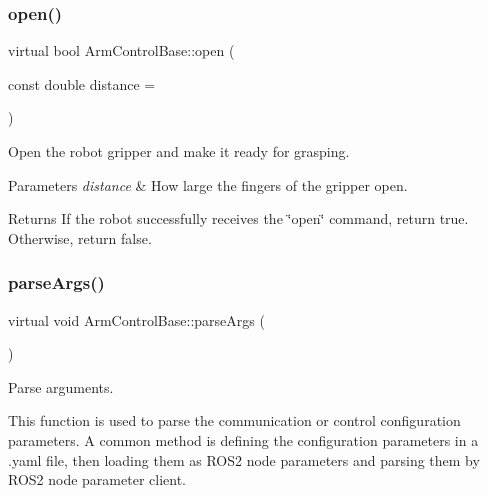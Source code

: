\subsubsection{\texorpdfstring{open()}{open()}}
{\footnotesize\ttfamily virtual bool Arm\+Control\+Base\+::open (\begin{DoxyParamCaption}\item[{const double}]{distance = {} }\end{DoxyParamCaption})\hspace{0.3cm}{\ttfamily [pure virtual]}}



Open the robot gripper and make it ready for grasping. 


\begin{DoxyParams}{Parameters}
{\em distance} & How large the fingers of the gripper open. \\
\hline
\end{DoxyParams}
\begin{DoxyReturn}{Returns}
If the robot successfully receives the \char`\"{}open\char`\"{} command, return true. Otherwise, return false. 
\end{DoxyReturn}
\mbox{\label{classArmControlBase_ad7127c4d537e4cf386e0b315c4ae7386}} 
\subsubsection{\texorpdfstring{parse\+Args()}{parseArgs()}}
{\footnotesize\ttfamily virtual void Arm\+Control\+Base\+::parse\+Args (\begin{DoxyParamCaption}{ }\end{DoxyParamCaption})\hspace{0.3cm}{\ttfamily [pure virtual]}}



Parse arguments. 

This function is used to parse the communication or control configuration parameters. A common method is defining the configuration parameters in a .yaml file, then loading them as R\+O\+S2 node parameters and parsing them by R\+O\+S2 node parameter client. \mbox{\label{classArmControlBase_a447f53d50fb181492bf66a26e05c9aea}} 
